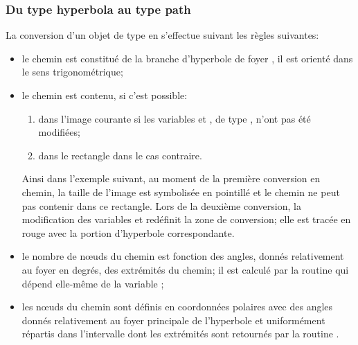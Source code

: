 \documentclass[pdftex]{article}
\begin{document}
\subsubsection{\texorpdfstring{Du type \og{}hyperbola\fg{} au type
    \og{}path\fg{}}{Du type «hyperbola» au type «path»}}
La conversion d'un objet  de type  en 
s'effectue suivant les règles suivantes:
\begin{itemize}
\item le chemin est constitué de la branche d'hyperbole de
  foyer , il est orienté dans le sens trigonométrique;
\item
  le chemin est contenu, si c'est possible:
  \begin{enumerate}
  \item dans l'image courante si les variables 
    et , de type , n'ont pas été modifiées;
  \item dans le rectangle  dans le cas
    contraire.
  \end{enumerate}
  Ainsi dans l'exemple suivant, au moment de la première conversion en
  chemin, la taille de l'image est symbolisée en pointillé et le
  chemin ne peut pas contenir dans ce rectangle. Lors de la deuxième
  conversion, la modification des variables 
  et  redéfinit la zone de conversion; elle est tracée
  en rouge avec la portion d'hyperbole correspondante.
\item le nombre de n\oe{}uds du chemin est fonction des angles, donnés
  relativement au foyer en degrés, des extrémités du chemin; il est calculé par la routine
  \linebreak{}%
  qui dépend elle-même de la variable
  ;
\item les n\oe{}uds du chemin sont définis en coordonnées polaires
  avec des angles donnés relativement au foyer principale 
  de l'hyperbole et uniformément répartis dans l'intervalle dont les
  extrémités sont retournés par la routine
  .
\end{itemize}
\end{document}
